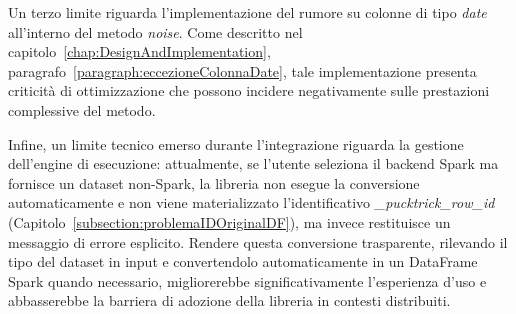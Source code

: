\documentclass[../main.tex]{subfiles}
\begin{document}
Un terzo limite riguarda l'implementazione del rumore su colonne di tipo \textit{date} all'interno del metodo \textit{noise}. Come descritto nel capitolo~\ref{chap:DesignAndImplementation}, paragrafo~\ref{paragraph:eccezioneColonnaDate}, tale implementazione presenta criticità di ottimizzazione che possono incidere negativamente sulle prestazioni complessive del metodo.

Infine, un limite tecnico emerso durante l'integrazione riguarda la gestione dell'engine di esecuzione: attualmente, se l'utente seleziona il backend Spark ma fornisce un dataset non-Spark, la libreria non esegue la conversione automaticamente e non viene materializzato l'identificativo \textit{\_pucktrick\_row\_id} (Capitolo~\ref{subsection:problemaIDOriginalDF}), ma invece restituisce un messaggio di errore esplicito. Rendere questa conversione trasparente, rilevando il tipo del dataset in input e convertendolo automaticamente in un DataFrame Spark quando necessario, migliorerebbe significativamente l'esperienza d'uso e abbasserebbe la barriera di adozione della libreria in contesti distribuiti.
\end{document}
